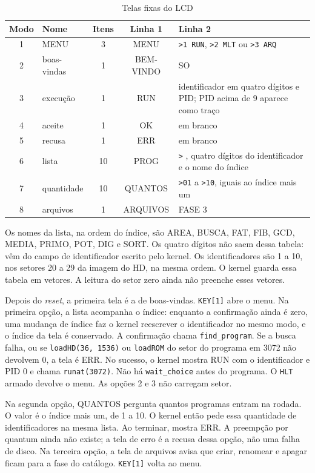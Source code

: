 \documentclass[
    12pt,
    openright,
    a4paper,
    english,
    brazilian
]{abntex2}
\begin{document}
\begin{table}[H]
\centering
\caption{Telas fixas do LCD}
\label{tab:lcd}
\small
\begin{tabular}{clccp{6.2cm}}
\toprule
\textbf{Modo} & \textbf{Nome} & \textbf{Itens} & \textbf{Linha 1} & \textbf{Linha 2} \\
\midrule
1 & MENU & 3 & MENU & \texttt{>1 RUN}, \texttt{>2 MLT} ou \texttt{>3 ARQ} \\
2 & boas-vindas & 1 & BEM-VINDO & SO \\
3 & execução & 1 & RUN & identificador em quatro dígitos e PID; PID acima de 9 aparece como traço \\
4 & aceite & 1 & OK & em branco \\
5 & recusa & 1 & ERR & em branco \\
6 & lista & 10 & PROG & \texttt{>} , quatro dígitos do identificador e o nome do índice \\
7 & quantidade & 10 & QUANTOS & \texttt{>01} a \texttt{>10}, iguais ao índice mais um \\
8 & arquivos & 1 & ARQUIVOS & FASE 3 \\
\bottomrule
\end{tabular}
\end{table}

Os nomes da lista, na ordem do índice, são AREA, BUSCA, FAT, FIB, GCD, MEDIA, PRIMO, POT, DIG e SORT. Os quatro dígitos não saem dessa tabela: vêm do campo de identificador escrito pelo kernel. Os identificadores são 1 a 10, nos setores 20 a 29 da imagem do HD, na mesma ordem. O kernel guarda essa tabela em vetores. A leitura do setor zero ainda não preenche esses vetores.

Depois do \emph{reset}, a primeira tela é a de boas-vindas. \texttt{KEY[1]} abre o menu. Na primeira opção, a lista acompanha o índice: enquanto a confirmação ainda é zero, uma mudança de índice faz o kernel reescrever o identificador no mesmo modo, e o índice da tela é conservado. A confirmação chama \texttt{find\_program}. Se a busca falha, ou se \texttt{loadHD(36, 1536)} ou \texttt{loadROM} do setor do programa em 3072 não devolvem 0, a tela é ERR. No sucesso, o kernel mostra RUN com o identificador e PID 0 e chama \texttt{runat(3072)}. Não há \texttt{wait\_choice} antes do programa. O \texttt{HLT} armado devolve o menu. As opções 2 e 3 não carregam setor.

Na segunda opção, QUANTOS pergunta quantos programas entram na rodada. O valor é o índice mais um, de 1 a 10. O kernel então pede essa quantidade de identificadores na mesma lista. Ao terminar, mostra ERR. A preempção por quantum ainda não existe; a tela de erro é a recusa dessa opção, não uma falha de disco. Na terceira opção, a tela de arquivos avisa que criar, renomear e apagar ficam para a fase do catálogo. \texttt{KEY[1]} volta ao menu.
\end{document}
